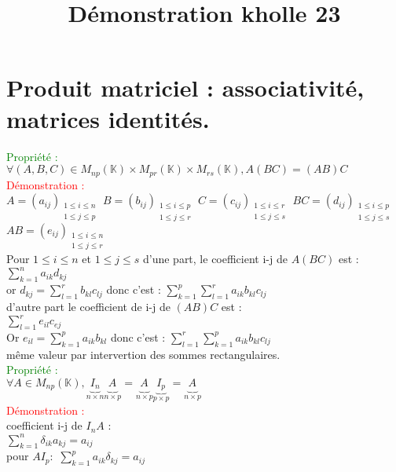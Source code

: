 \documentclass{article}
\begin{document}
\title{Démonstration kholle 23}
\date{}
\maketitle
	\renewcommand{\thesection}{\Roman{section}}
	\setlength{\parindent}{1.5cm}
	\section{ Produit matriciel : associativité, matrices identités.}
	\textcolor{green}{Propriété :}
	$\forall (A,B,C) \in M_{np}(\mathbb K) \times M_{pr}(\mathbb K) \times M_{rs}(\mathbb K), A(BC)=(AB)C$ \\
	\textcolor{red}{Démonstration :} \\
	$A=(a_{ij}){}_{\substack{1\leq i\leq n \\ 1\leq j\leq p}}$
	$B=(b_{ij}){}_{\substack{1\leq i\leq p \\ 1\leq j\leq r}}$
	 $C=(c_{ij}){}_{\substack{1\leq i\leq r \\ 1\leq j\leq s}}$
	 $BC=(d_{ij}){}_{\substack{1\leq i\leq p \\ 1\leq j\leq s}}$
	 $AB=(e_{ij}){}_{\substack{1\leq i\leq n \\ 1\leq j\leq r}}$ \\
	 Pour $1 \leq i \leq n$ et $1 \leq j \leq s$ d'une part, le coefficient i-j de $A(BC)$ est :\\
	  $\sum_{k=1}^n a_{ik}d_{kj}$ \\
	 or $d_{kj}= \sum_{l=1}^r b_{kl} c_{lj}$ donc c'est : $\sum_{k=1}^p \sum_{l=1}^r a_{ik}b_{kl}c_{lj}$ \\
	 d'autre part le coefficient de i-j de $(AB)C$ est : \\
	 $\sum_{l=1}^r e_{il}c_{ej}$ \\
	 Or $e_{il}= \sum_{k=1}^p a_{ik} b_{kl}$ donc c'est : $\sum_{l=1}^r \sum_{k=1}^p a_{ik} b_{kl} c_{lj}$ \\
	 même valeur par intervertion des sommes rectangulaires. \\
	 \textcolor{green}{Propriété :} \\
	 $\forall A \in M_{np}(\mathbb K), \underbrace{I_n}_{n \times n} \underbrace{A_{}}_{n \times p} = \underbrace{A_{}}_{n \times p} \underbrace{I_p}_{p \times p} = \underbrace{A_{}}_{n \times p} $ \\
	 \textcolor{red}{Démonstration :} \\
	 coefficient  i-j de $I_nA$ : \\
	 $\sum_{k=1}^n \delta_{ik}a_{kj}=a_{ij}$ \\
	 pour $A I_p :$ $\sum_{k=1}^p a_{ik} \delta_{kj}=a_{ij}$
\end{document}
